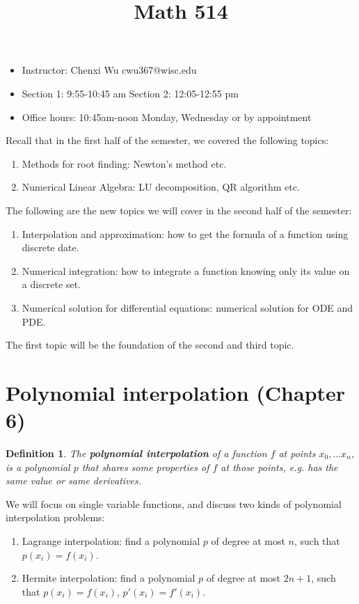\documentclass{article} %
\title{Math 514}
\theoremstyle{break}
\newtheorem{definition}{Definition}[section]
\begin{document}
\maketitle
  \begin{itemize}
  \item Instructor: Chenxi Wu cwu367@wisc.edu
 \item Section 1: 9:55-10:45 am Section 2: 12:05-12:55 pm  
  \item Office hours: 10:45am-noon Monday, Wednesday or by appointment
  \end{itemize}
  
  Recall that in the first half of the semester, we covered the following topics:
  \begin{enumerate}
  \item Methods for root finding: Newton's method etc.
  \item Numerical Linear Algebra: LU decomposition, QR algorithm etc.
  \end{enumerate}
  
  The following are the new topics we will cover in the second half of the semester:
  \begin{enumerate}
  \item Interpolation and approximation: how to get the formula of a function using discrete date.
  \item Numerical integration: how to integrate a function knowing only its value on a discrete set. 
  \item Numerical solution for differential equations: numerical solution for ODE and PDE.
  \end{enumerate}
  The first topic will be the foundation of the second and third topic.

  \newpage
  
\tableofcontents
\newpage
  
  \section{Polynomial interpolation (Chapter 6)}
  
  \begin{definition}
   The {\bf polynomial interpolation} of a function $f$ at points $x_0, \dots x_n$, is a polynomial $p$ that shares some properties of $f$ at those points, e.g. has the same value or same derivatives.
  \end{definition}

  We will focus on single variable functions, and discuss two kinds of polynomial interpolation problems:
  \begin{enumerate}
  \item Lagrange interpolation: find a polynomial $p$ of degree at most $n$, such that $p(x_i)=f(x_i)$.
  \item Hermite interpolation: find a polynomial $p$ of degree at most $2n+1$, such that $p(x_i)=f(x_i)$, $p'(x_i)=f'(x_i)$.
  \end{enumerate}
\end{document}
